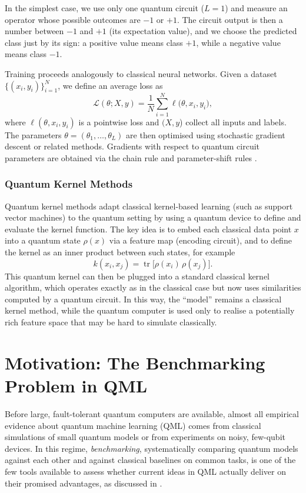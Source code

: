 \documentclass[12pt,a4paper,openany]{report}
\let\parencite\citep
\let\textcite\citet
\begin{document}
In the simplest case, we use only one quantum circuit (\(L = 1\)) and measure an
operator whose possible outcomes are \(-1\) or \(+1\). The circuit output is then
a number between \(-1\) and \(+1\) (its expectation value), and we choose the
predicted class just by its sign: a positive value means class \(+1\), while a
negative value means class \(-1\).

Training proceeds analogously to classical neural networks. Given a dataset
\(\{(x_i,y_i)\}_{i=1}^N\), we define an average loss as
\[
    \mathcal{L}(\theta; X, y)
    = \frac{1}{N}\sum_{i=1}^N \ell\bigl(\theta, x_i, y_i\bigr),
\]
where \(\ell(\theta,x_i,y_i)\) is a pointwise loss and \((X,y\))
collect all inputs and labels. The parameters
\(\theta = (\theta_1,\dots,\theta_L)\) are then optimised using stochastic
gradient descent or related methods. Gradients with respect to quantum circuit
parameters are obtained via the chain rule and parameter-shift rules \parencite{mitarai2018quantum,schuld2019evaluating}.


\subsubsection{Quantum Kernel Methods}

Quantum kernel methods adapt classical kernel-based learning (such as support
vector machines) to the quantum setting by using a quantum device to define and
evaluate the kernel function. The key idea is to embed each classical data point
\(x\) into a quantum state \(\rho(x)\) via a feature map (encoding circuit), and
to define the kernel as an inner product between such states, for example
\[
    k(x_i, x_j) = \operatorname{tr}\big[\rho(x_i)\,\rho(x_j)\big].
\]
This quantum kernel can then be plugged into a standard classical kernel
algorithm, which operates exactly as in the classical case but now uses
similarities computed by a quantum circuit. In this way, the “model” remains a
classical kernel method, while the quantum computer is used only to realise a
potentially rich feature space that may be hard to simulate classically.

\section{Motivation: The Benchmarking Problem in QML}

Before large, fault-tolerant quantum computers are available, almost all empirical evidence about quantum machine learning (QML) comes from classical simulations of small quantum models or from experiments on noisy, few-qubit devices. In this regime, \emph{benchmarking}, systematically comparing quantum models against each other and against classical baselines on common tasks, is one of the few tools available to assess whether current ideas in QML actually deliver on their promised advantages, as discussed in \textcite{bowles2024better}. 
\end{document}
